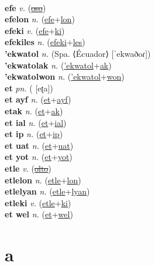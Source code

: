  \label{'espaketti} \\
\textbf{efe} \textit{v.} (\hyperref[oso]{\sout{oso}})
 \label{efe} \\
\textbf{efelon} \textit{n.} (\hyperref[efe]{efe}+\hyperref[lon]{lon})
 \label{efelon} \\
\textbf{efeki} \textit{v.} (\hyperref[efe]{efe}+\hyperref[ki]{ki})
 \label{efeki} \\
\textbf{efekiles} \textit{n.} (\hyperref[efeki]{efeki}+\hyperref[les]{les})
 \label{efekiles} \\
\textbf{'ekwatol} \textit{n.} (Spa. ⟨Écuador⟩ [ˈekwaðoɾ])
 \label{'ekwatol} \\
\textbf{'ekwatolak} \textit{n.} (\hyperref['ekwatol]{'ekwatol}+\hyperref[ak]{ak})
 \label{'ekwatolak} \\
\textbf{'ekwatolwon} \textit{n.} (\hyperref['ekwatol]{'ekwatol}+\hyperref[won]{won})
 \label{'ekwatolwon} \\
\textbf{et} \textit{pn.} ( [eʈa])
 \label{et} \\
\textbf{et ayf} \textit{n.} (\hyperref[et]{et}+\hyperref[ayf]{ayf})
 \label{et ayf} \\
\textbf{etak} \textit{n.} (\hyperref[et]{et}+\hyperref[ak]{ak})
 \label{etak} \\
\textbf{et ial} \textit{n.} (\hyperref[et]{et}+\hyperref[ial]{ial})
 \label{et ial} \\
\textbf{et ip} \textit{n.} (\hyperref[et]{et}+\hyperref[ip]{ip})
 \label{et ip} \\
\textbf{et uat} \textit{n.} (\hyperref[et]{et}+\hyperref[uat]{uat})
 \label{et uat} \\
\textbf{et yot} \textit{n.} (\hyperref[et]{et}+\hyperref[yot]{yot})
 \label{et yot} \\
\textbf{etle} \textit{v.} (\hyperref[olto]{\sout{olto}})
 \label{etle} \\
\textbf{etlelon} \textit{n.} (\hyperref[etle]{etle}+\hyperref[lon]{lon})
 \label{etlelon} \\
\textbf{etlelyan} \textit{n.} (\hyperref[etle]{etle}+\hyperref[lyan]{lyan})
 \label{etlelyan} \\
\textbf{etleki} \textit{v.} (\hyperref[etle]{etle}+\hyperref[ki]{ki})
 \label{etleki} \\
\textbf{et wel} \textit{n.} (\hyperref[et]{et}+\hyperref[wel]{wel})
 \label{et wel} 

\section{a}

